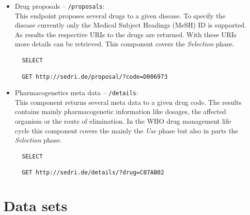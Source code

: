\begin{itemize}
\item Drug proposals -- \texttt{/proposals}:\\
This endpoint proposes several drugs to a given disease.
To specify the disease currently only the Medical Subject Headings (MeSH) ID is supported.
As results the respective URIs to the drugs are returned.
With these URIs more details can be retrieved.
This component covers the \textit{Selection} phase.
\begin{lstlisting}
  SELECT
\end{lstlisting}
\begin{lstlisting}
  GET http://sedri.de/proposal/?code=D006973
\end{lstlisting}

\item Pharmacogenetics meta data -- \texttt{/details}:\\
This component returns several meta data to a given drug code.
The results contains mainly pharmacogenetic information like dosages, the affected organism or the route of elimination.
In the WHO drug management life cycle this component covers the mainly the \textit{Use} phase but also in parts the \textit{Selection} phase.

\begin{lstlisting}
  SELECT
\end{lstlisting}
\begin{lstlisting}
  GET http://sedri.de/details/?drug=C07AB02
\end{lstlisting}

\end{itemize}

\section{Data sets}
\label{sec:data-sets}


